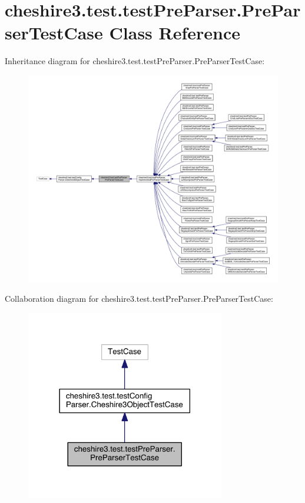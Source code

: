 \hypertarget{classcheshire3_1_1test_1_1test_pre_parser_1_1_pre_parser_test_case}{\section{cheshire3.\-test.\-test\-Pre\-Parser.\-Pre\-Parser\-Test\-Case Class Reference}
\label{classcheshire3_1_1test_1_1test_pre_parser_1_1_pre_parser_test_case}
}


Inheritance diagram for cheshire3.\-test.\-test\-Pre\-Parser.\-Pre\-Parser\-Test\-Case\-:
\nopagebreak
\begin{figure}[H]
\begin{center}
\leavevmode
\includegraphics[width=350pt]{classcheshire3_1_1test_1_1test_pre_parser_1_1_pre_parser_test_case__inherit__graph}
\end{center}
\end{figure}


Collaboration diagram for cheshire3.\-test.\-test\-Pre\-Parser.\-Pre\-Parser\-Test\-Case\-:
\nopagebreak
\begin{figure}[H]
\begin{center}
\leavevmode
\includegraphics[width=246pt]{classcheshire3_1_1test_1_1test_pre_parser_1_1_pre_parser_test_case__coll__graph}
\end{center}
\end{figure}
